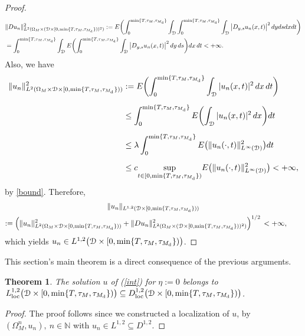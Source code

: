 \documentclass[reqno]{amsart}
\numberwithin{equation}{section}
\newtheorem{theorem}{Theorem}[section]
\newcommand{\mN}{\mathbb{N}}
\newcommand{\Om}{\Omega}
\newcommand{\cd}{\mathcal{D}}
\begin{document}
\begin{proof}
\begin{align*}
&\|Du_{n}\|^2_{L^{2}(\Om_M\times(\cd\times[0,\min\{T,\tau_M,\tau_{M_{\rm d}}\}))^{2})}
:=
E\biggl{(}\int_0^{\min\{T,\tau_M,\tau_{M_{\rm d}}\}}\int_{\mathcal{D}}\int_0^{\min\{T,\tau_M,\tau_{M_{\rm d}}\}}\int_{\cd}\big{|}D_{y,s}u_n(x,t)\big{|}^{2}\, dydsdxdt\biggr{)}
\\
&= \int_0^{\min\{T,\tau_M,\tau_{M_{\rm d}}\}}\int_{\cd}E\biggl{(}\int_0^{\min\{T,\tau_M,\tau_{M_{\rm d}}\}}
\int_{\cd}\big{|}D_{y,s}u_{n}(x,t)\big{|}^{2}\,dy\,ds\biggr{)}dx\,dt < +\infty.
\end{align*}
Also, we have
\begin{align*}
\|u_n\|^2_{L^2(\Om_M\times\cd\times[0,\min\{T,\tau_M,\tau_{M_{\rm d}}\}))}&:=E\biggl{(}\int_0^{\min\{T,\tau_M,\tau_{M_{\rm d}}\}}
\int_{\cd}|u_n(x,t)|^2\,dx\,dt\biggr{)}\\[0.2cm] &\leq \int_0^{\min\{T,\tau_M,\tau_{M_{\rm d}}\}}E\biggl{(}\int_{\cd}|u_n(x,t)|^{2}\,dx\biggr{)}dt
\\[0.2cm]
&\leq \lambda \int_0^{\min\{T,\tau_M,\tau_{M_{\rm d}}\}}E\bigl{(}\|u_n(\cdot,t)\|^2_{L^{\infty}(\cd)}\bigr{)}dt
\\[0.2cm]
&\leq c \underset{t\in[0,\min\{T,\tau_M,\tau_{M_{\rm d}}\})}{\text{sup}}E\bigl{(}\|u_n(\cdot,t)\|^2_{L^{\infty}(\cd)}\bigr{)}<+\infty ,
\end{align*}
by \eqref{bound}. Therefore,
\begin{multline*}
\|u_n\|_{L^{1,2}(\cd\times[0,\min\{T,\tau_M,\tau_{M_{\rm d}}\}))}
\\
:=\left(\|u_{n}\|^{2}_{L^{2}(\Om_M\times\cd\times[0,\min\{T,\tau_M,\tau_{M_{\rm d}}\}))}
+\|Du_{n}\|^2_{L^2(\Om_M\times(\cd\times[0,\min\{T,\tau_M,\tau_{M_{\rm d}}\}))^2)}\right)^{1/2}
\, < +\infty, \qquad
\end{multline*}
which yields $u_n\in L^{1,2}\bigl{(}\cd\times[0,\min\{T,\tau_M,\tau_{M_{\rm
d}}\})\bigr{)}$.
\end{proof}

This section's main theorem is a direct consequence of the
previous arguments.

\begin{theorem}
The solution $u$ of (\ref{int}) for $\eta:=0$ belongs to $L^{1,2}_{\text{loc}}\bigl(\cd\times[0,\min\{T,\tau_M,\tau_{M_{\rm d}}\})\bigr)
\subseteq D^{1,2}_{\text{loc}}\bigl(\cd\times[0,\min\{T,\tau_M,\tau_{M_{\rm d}}\})\bigr)$.
\end{theorem}
\begin{proof}
The proof follows since we constructed a localization of $u$, by $(\Omega_M^n,u_n),\ n\in\mN$ with $u_n\in L^{1,2}\subseteq D^{1,2}$.
\end{proof}
\end{document}
